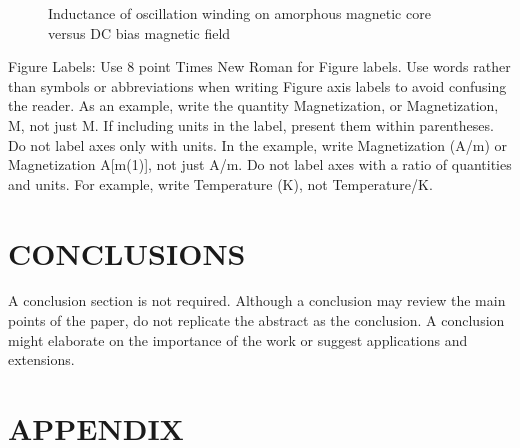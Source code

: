 \documentclass[letterpaper, 10 pt, conference]{ieeeconf}  %
\begin{document}
	
	\begin{figure}[thpb]
		\centering
		\caption{Inductance of oscillation winding on amorphous
			magnetic core versus DC bias magnetic field}
		\label{figurelabel}
	\end{figure}
	
	
	Figure Labels: Use 8 point Times New Roman for Figure labels. Use words rather than symbols or abbreviations when writing Figure axis labels to avoid confusing the reader. As an example, write the quantity Magnetization, or Magnetization, M, not just M. If including units in the label, present them within parentheses. Do not label axes only with units. In the example, write Magnetization (A/m) or Magnetization {A[m(1)]}, not just A/m. Do not label axes with a ratio of quantities and units. For example, write Temperature (K), not Temperature/K.
	
	\section{CONCLUSIONS}
	
	A conclusion section is not required. Although a conclusion may review the main points of the paper, do not replicate the abstract as the conclusion. A conclusion might elaborate on the importance of the work or suggest applications and extensions. 
	
	\addtolength{\textheight}{-12cm}   %
	
	
	
	
	
	
	
	\section*{APPENDIX}
	
\end{document}
